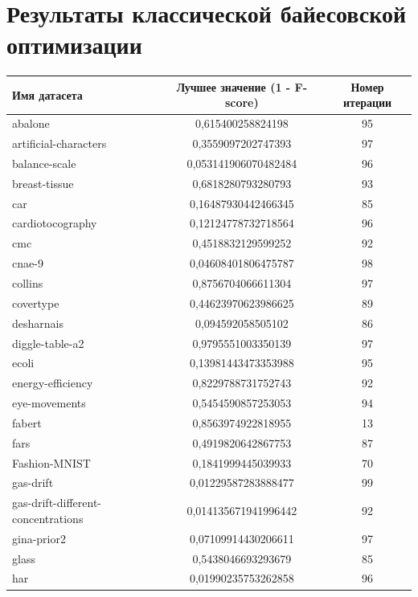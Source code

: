 \documentclass[times,specification,annotation]{itmo-student-thesis}
\begin{document}
\chapter{Результаты классической байесовской оптимизации}\label{app:bo-results}
\begin{center}
	\begin{longtable}{ |m{5cm}|c|c| } 
		\hline
		\textbf{Имя датасета} & \textbf{Лучшее значение (1 - F-score)} & \textbf{Номер итерации} \\ 
		\hline\hline
		abalone & 0,615400258824198 & 95 \\
		\hline
		artificial-characters & 0,3559097202747393 & 97 \\
		\hline
		balance-scale & 0,053141906070482484 & 96 \\
		\hline
		breast-tissue & 0,6818280793280793 & 93 \\
		\hline
		car & 0,16487930442466345 & 85 \\
		\hline
		cardiotocography & 0,12124778732718564 & 96 \\
		\hline
		cmc & 0,4518832129599252 & 92 \\
		\hline
		cnae-9 & 0,04608401806475787 & 98 \\
		\hline
		collins & 0,8756704066611304 & 97 \\
		\hline
		covertype & 0,44623970623986625 & 89 \\
		\hline
		desharnais & 0,094592058505102 & 86 \\
		\hline
		diggle-table-a2 & 0,9795551003350139 & 97 \\
		\hline
		ecoli & 0,13981443473353988 & 95 \\
		\hline
		energy-efficiency & 0,8229788731752743 & 92 \\
		\hline
		eye-movements & 0,5454590857253053 & 94 \\
		\hline
		fabert & 0,8563974922818955 & 13 \\
		\hline
		fars & 0,4919820642867753 & 87 \\
		\hline
		Fashion-MNIST & 0,1841999445039933 & 70 \\
		\hline
		gas-drift & 0,01229587283888477 & 99 \\
		\hline
		gas-drift-different-concentrations & 0,014135671941996442 & 92 \\
		\hline
		gina-prior2 & 0,07109914430206611 & 97 \\
		\hline
		glass & 0,5438046693293679 & 85 \\
		\hline
		har & 0,01990235753262858 & 96 \\

\end{longtable}
\end{center}
\end{document}
